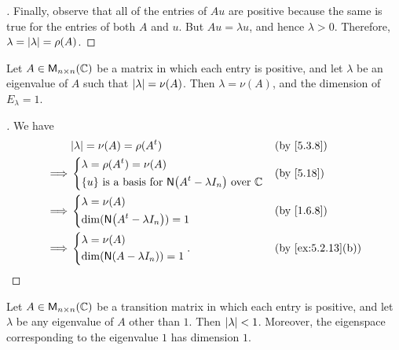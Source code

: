 \begin{proof}[]
	Finally, observe that all of the entries of \(Au\) are positive because the same is true for the entries of both \(A\) and \(u\).
	But \(Au = \lambda u\), and hence \(\lambda > 0\).
	Therefore, \(\lambda = \left\lvert\lambda\right\rvert = \rho(A)\).
\end{proof}

\begin{cor}\label{5.3.13}
	Let \(A \in \ms[n][n][\C]\) be a matrix in which each entry is positive, and let \(\lambda\) be an eigenvalue of \(A\) such that \(\left\lvert\lambda\right\rvert = \nu(A)\).
	Then \(\lambda = \nu(A)\), and the dimension of \(E_{\lambda} = 1\).
\end{cor}

\begin{proof}[]
	We have
	\begin{align*}
		         & \abs{\lambda} = \nu(A) = \rho(\tp{A})                                                       &  & \by{5.3.8} \\
		\implies & \begin{dcases}
			           \lambda = \rho(\tp{A}) = \nu(A) \\
			           \set{u} \text{ is a basis for } \ns{\tp{A} - \lambda I_n} \text{ over } \C
		           \end{dcases} &  & \by{5.18}                  \\
		\implies & \begin{dcases}
			           \lambda = \nu(A) \\
			           \dim(\ns{\tp{A} - \lambda I_n}) = 1
		           \end{dcases}                          &  & \by{1.6.8}                                           \\
		\implies & \begin{dcases}
			           \lambda = \nu(A) \\
			           \dim(\ns{A - \lambda I_n}) = 1
		           \end{dcases}.                                                              &  & \by{ex:5.2.13}[b]
	\end{align*}
\end{proof}

\begin{cor}\label{5.3.14}
	Let \(A \in \ms[n][n][\C]\) be a transition matrix in which each entry is positive, and let \(\lambda\) be any eigenvalue of \(A\) other than \(1\).
	Then \(\left\lvert\lambda\right\rvert < 1\).
	Moreover, the eigenspace corresponding to the eigenvalue \(1\) has dimension \(1\).
\end{cor}

